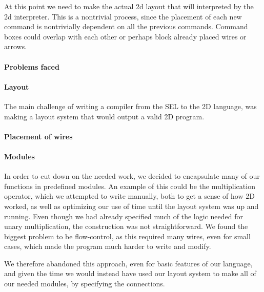 At this point we need to make the actual 2d layout that will
interpreted by the 2d interpreter. This is a nontrivial process,
since the placement of each new command is nontrivially dependent on all the
previous commands. Command boxes could
overlap with each other or perhaps block already placed wires or
arrows.

\paragraph{Problems faced}
\label{compiler:problems}

\paragraph{Layout}
\label{compiler:layout}
The main challenge of writing a compiler from the SEL to the 2D
language, was making a layout system that would output a valid 2D program.

\paragraph{Placement of wires}
\label{compiler:placement}


\paragraph{Modules}
\label{compiler:modules}
In order to cut down on the needed work, we decided to encapsulate
many of our functions in predefined modules. An example of this could
be the multiplication operator, which we attempted to write manually,
both to get a sense of how 2D worked, as well as optimizing our use of
time until the layout system was up and running. Even though we had
already specified much of the logic needed for unary multiplication,
the construction was not straightforward. We found the biggest
problem to be flow-control, as this required many wires, even for
small cases, which made the program much harder to write and modify.

We therefore abandoned this approach, even for basic features of our
language, and given the time we would instead have used our layout
system to make all of our needed modules, by specifying the connections.

